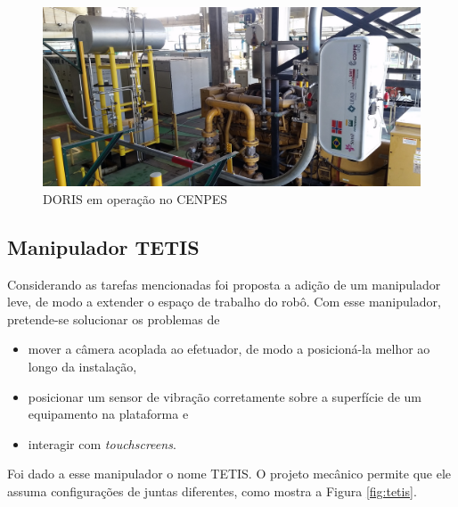 \begin{figure}[!ht]
\centering
  \includegraphics[width=\linewidth]{./img/cenpes_field.jpg}
  \caption{DORIS em operação no CENPES}
  \label{fig:cenpes_doris}
\end{figure}%

\subsection{Manipulador TETIS}
Considerando as tarefas mencionadas foi proposta a adição de um manipulador leve, de modo a extender o espaço de trabalho do robô. Com esse manipulador, pretende-se solucionar os problemas de
\begin{itemize}
\item mover a câmera acoplada ao efetuador, de modo a posicioná-la melhor ao longo da instalação,
\item posicionar um sensor de vibração corretamente sobre a superfície de um equipamento na plataforma e
\item interagir com \textit{touchscreens}.
\end{itemize}

Foi dado a esse manipulador o nome TETIS. O projeto mecânico permite que ele assuma configurações de juntas diferentes, como mostra a Figura \ref{fig:tetis}. 

\newlength{\twosubhtt}
\newsavebox{\twosubboxt}

